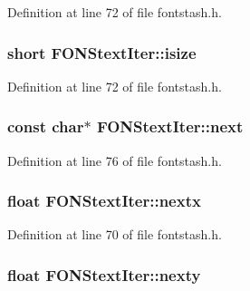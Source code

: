 Definition at line 72 of file fontstash.\+h.

\hypertarget{struct_f_o_n_stext_iter_ad19f972c53904750e404160b6d69b8ff}{
\subsubsection[{isize}]{\setlength{\rightskip}{0pt plus 5cm}short F\+O\+N\+Stext\+Iter\+::isize}}\label{struct_f_o_n_stext_iter_ad19f972c53904750e404160b6d69b8ff}


Definition at line 72 of file fontstash.\+h.

\hypertarget{struct_f_o_n_stext_iter_a18c670e9f18e733be4c92cd7e9b74ad3}{
\subsubsection[{next}]{\setlength{\rightskip}{0pt plus 5cm}const char$\ast$ F\+O\+N\+Stext\+Iter\+::next}}\label{struct_f_o_n_stext_iter_a18c670e9f18e733be4c92cd7e9b74ad3}


Definition at line 76 of file fontstash.\+h.

\hypertarget{struct_f_o_n_stext_iter_a6467960683f07de34018cdd9bfe03991}{
\subsubsection[{nextx}]{\setlength{\rightskip}{0pt plus 5cm}float F\+O\+N\+Stext\+Iter\+::nextx}}\label{struct_f_o_n_stext_iter_a6467960683f07de34018cdd9bfe03991}


Definition at line 70 of file fontstash.\+h.

\hypertarget{struct_f_o_n_stext_iter_a2f3311f7c9c6c182f2d70d9351db2882}{
\subsubsection[{nexty}]{\setlength{\rightskip}{0pt plus 5cm}float F\+O\+N\+Stext\+Iter\+::nexty}}\label{struct_f_o_n_stext_iter_a2f3311f7c9c6c182f2d70d9351db2882}


